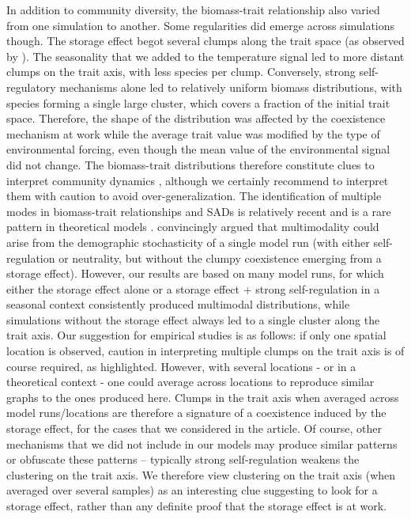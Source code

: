 \documentclass[smallcondensed,referee]{svjour3}       %
\begin{document}
In addition to community diversity, the biomass-trait relationship
also varied from one simulation to another. Some regularities did
emerge across simulations though. The storage effect begot several
clumps along the trait space (as observed by \citealp{scranton_coexistence_2016}).
The seasonality that we added to the temperature signal led to more
distant clumps on the trait axis, with less species per clump. Conversely,
strong self-regulatory mechanisms alone led to relatively uniform
biomass distributions, with species forming a single large cluster,
which covers a fraction of the initial trait space. Therefore, the
shape of the distribution was affected by the coexistence mechanism
at work while the average trait value was modified by the type of
environmental forcing, even though the mean value of the environmental
signal did not change. The biomass-trait distributions therefore constitute
clues to interpret community dynamics \citep{dandrea_challenges_2016,loranger_what_2018},
although we certainly recommend to interpret them with caution to
avoid over-generalization. The identification of multiple modes in
biomass-trait relationships and SADs is relatively recent \citep{dornelas_multiple_2008,matthews_multimodal_2014}
and is a rare pattern in theoretical models \citep{mcgill_species_2007}.
\citet{barabas_emergent_2013} convincingly argued that multimodality
could arise from the demographic stochasticity of a single model run
(with either self-regulation or neutrality, but without the clumpy
coexistence emerging from a storage effect). However, our results
are based on many model runs, for which either the storage effect
alone or a storage effect + strong self-regulation in a seasonal context
consistently produced multimodal distributions, while simulations
without the storage effect always led to a single cluster along the
trait axis. Our suggestion for empirical studies is as follows: if
only one spatial location is observed, caution in interpreting multiple
clumps on the trait axis is of course required, as \citet{barabas_emergent_2013}
highlighted. However, with several locations - or in a theoretical
context - one could average across locations to reproduce similar
graphs to the ones produced here. Clumps in the trait axis when averaged
across model runs/locations are therefore a signature of a coexistence
induced by the storage effect, for the cases that we considered in
the article. Of course, other mechanisms that we did not include in
our models may produce similar patterns \citep{rael2018emergent}
or obfuscate these patterns -- typically strong self-regulation weakens
the clustering on the trait axis. We therefore view clustering on
the trait axis (when averaged over several samples) as an interesting
clue suggesting to look for a storage effect, rather than any definite
proof that the storage effect is at work. 
\end{document}
